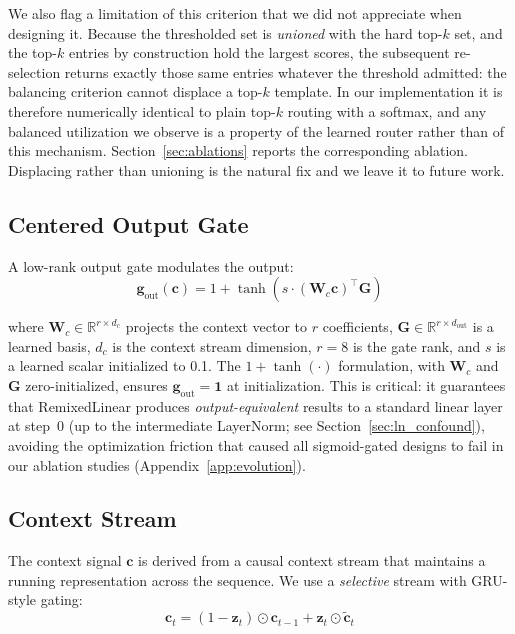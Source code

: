 \documentclass{article}
\begin{document}
We also flag a limitation of this criterion that we did not appreciate when designing it. Because the thresholded set is \emph{unioned} with the hard top-$k$ set, and the top-$k$ entries by construction hold the largest scores, the subsequent re-selection returns exactly those same entries whatever the threshold admitted: the balancing criterion cannot displace a top-$k$ template. In our implementation it is therefore numerically identical to plain top-$k$ routing with a softmax, and any balanced utilization we observe is a property of the learned router rather than of this mechanism. Section~\ref{sec:ablations} reports the corresponding ablation. Displacing rather than unioning is the natural fix and we leave it to future work.

\subsection{Centered Output Gate}
\label{sec:gate}

A low-rank output gate modulates the output:
\begin{equation}
\mathbf{g}_\text{out}(\mathbf{c}) = 1 + \tanh\!\left(s \cdot (\mathbf{W}_c \mathbf{c})^\top \mathbf{G}\right)
\end{equation}

\noindent where $\mathbf{W}_c \in \mathbb{R}^{r \times d_c}$ projects the context vector to $r$ coefficients, $\mathbf{G} \in \mathbb{R}^{r \times d_\text{out}}$ is a learned basis, $d_c$ is the context stream dimension, $r{=}8$ is the gate rank, and $s$ is a learned scalar initialized to 0.1. The $1 + \tanh(\cdot)$ formulation, with $\mathbf{W}_c$ and $\mathbf{G}$ zero-initialized, ensures $\mathbf{g}_\text{out} = \mathbf{1}$ at initialization. This is critical: it guarantees that RemixedLinear produces \emph{output-equivalent} results to a standard linear layer at step~0 (up to the intermediate LayerNorm; see Section~\ref{sec:ln_confound}), avoiding the optimization friction that caused all sigmoid-gated designs to fail in our ablation studies (Appendix~\ref{app:evolution}).

\subsection{Context Stream}
\label{sec:context}

The context signal $\mathbf{c}$ is derived from a causal context stream that maintains a running representation across the sequence. We use a \emph{selective} stream with GRU-style gating:
\begin{equation}
\mathbf{c}_t = (1 - \mathbf{z}_t) \odot \mathbf{c}_{t-1} + \mathbf{z}_t \odot \tilde{\mathbf{c}}_t
\end{equation}
\end{document}
